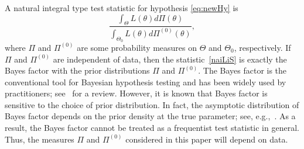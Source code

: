 \documentclass[11pt]{article}
\newcommand\CG[1]{\textcolor{red}{#1}}
\theoremstyle{plain}
\theoremstyle{definition}
\theoremstyle{remark}
\begin{document}
A natural integral type test statistic for hypothesis \eqref{eq:newHy} is
\begin{equation}\label{naiLiS}
\frac{\int_{\Theta}L(\theta) d\Pi(\theta)}{\int_{\Theta_0} L(\theta) d\Pi^{(0)}(\theta)},
\end{equation}
where $\Pi$ and $\Pi^{(0)}$ are some probability measures on $\Theta$ and $\Theta_{0}$, respectively.
If $\Pi$ and $\Pi^{(0)}$ are independent of data, then the statistic~\eqref{naiLiS} is exactly the Bayes factor \citep{scientificInference} with the prior distributions $\Pi$ and $\Pi^{(0)}$.
The Bayes factor is the conventional tool for Bayesian hypothesis testing and has been widely used by practitioners; see~\cite{Robert1995Bayes} for a review.
However, it is known that Bayes factor is sensitive to the choice of prior distribution. 
In fact, the asymptotic distribution of Bayes factor depends on the prior density at the true parameter; see, e.g.,~\cite{clarke1990information}.
As a result, the Bayes factor cannot be treated as a frequentist test statistic in general.
Thus, the measures $\Pi$ and $\Pi^{(0)}$ considered in this paper will depend on data.
\end{document}
